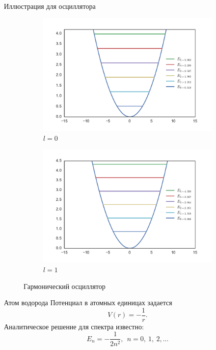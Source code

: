 \documentclass{beamer}
\begin{document}
\begin{frame}{Иллюстрация для осциллятора}
\begin{figure}[h!]
\centering
\begin{subfigure}{.5\textwidth}
  \centering
  \includegraphics[width=1.0\linewidth]{harm_osc.pdf}
  \caption{$l = 0$}
  \label{fig1:tan-sqrt}
\end{subfigure}%
\begin{subfigure}{.5\textwidth}
  \centering
  \includegraphics[width=1.0\linewidth]{harm_osc1.pdf}
  \caption{$l=1$}
  \label{fig:finite_well_sol}
\end{subfigure}
\caption{Гармонический осциллятор}
\label{fig:fin_well}
\end{figure}

\end{frame}

\begin{frame}{Атом водорода}
Потенциал в атомных единицах задается
$$V(r) = -\frac{1}{r}.$$
Аналитическое решение для спектра известно:
$$E_n = -\frac{1}{2 n^2},~~ n = 0,~1,~2,...$$

\end{frame}
\end{document}
